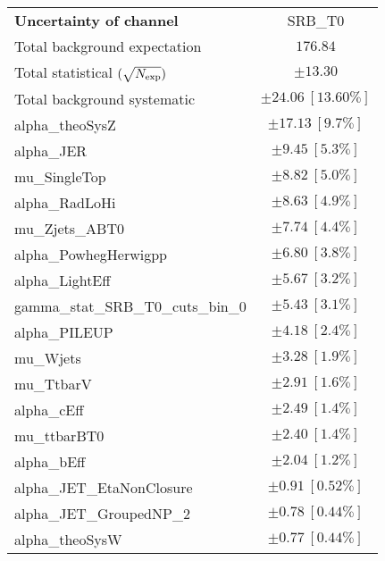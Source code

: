 
\begin{table}
\begin{center}
\setlength{\tabcolsep}{0.0pc}
\begin{tabular*}{\textwidth}{@{\extracolsep{\fill}}lc}
\noalign{\smallskip}\hline\noalign{\smallskip}
{\bf Uncertainty of channel}                                    & SRB\_T0            \\
\noalign{\smallskip}\hline\noalign{\smallskip}
Total background expectation             &  $176.84$       \\
\noalign{\smallskip}\hline\noalign{\smallskip}
Total statistical $(\sqrt{N_{\rm exp}})$              & $\pm 13.30$       \\
Total background systematic               & $\pm 24.06\ [13.60\%] $             \\
\noalign{\smallskip}\hline\noalign{\smallskip}
\noalign{\smallskip}\hline\noalign{\smallskip}
alpha\_theoSysZ         & $\pm 17.13\ [9.7\%] $       \\
alpha\_JER         & $\pm 9.45\ [5.3\%] $       \\
mu\_SingleTop         & $\pm 8.82\ [5.0\%] $       \\
alpha\_RadLoHi         & $\pm 8.63\ [4.9\%] $       \\
mu\_Zjets\_ABT0         & $\pm 7.74\ [4.4\%] $       \\
alpha\_PowhegHerwigpp         & $\pm 6.80\ [3.8\%] $       \\
alpha\_LightEff         & $\pm 5.67\ [3.2\%] $       \\
gamma\_stat\_SRB\_T0\_cuts\_bin\_0         & $\pm 5.43\ [3.1\%] $       \\
alpha\_PILEUP         & $\pm 4.18\ [2.4\%] $       \\
mu\_Wjets         & $\pm 3.28\ [1.9\%] $       \\
mu\_TtbarV         & $\pm 2.91\ [1.6\%] $       \\
alpha\_cEff         & $\pm 2.49\ [1.4\%] $       \\
mu\_ttbarBT0         & $\pm 2.40\ [1.4\%] $       \\
alpha\_bEff         & $\pm 2.04\ [1.2\%] $       \\
alpha\_JET\_EtaNonClosure         & $\pm 0.91\ [0.52\%] $       \\
alpha\_JET\_GroupedNP\_2         & $\pm 0.78\ [0.44\%] $       \\
alpha\_theoSysW         & $\pm 0.77\ [0.44\%] $       \\

\end{tabular*}
\end{center}
\end{table}
